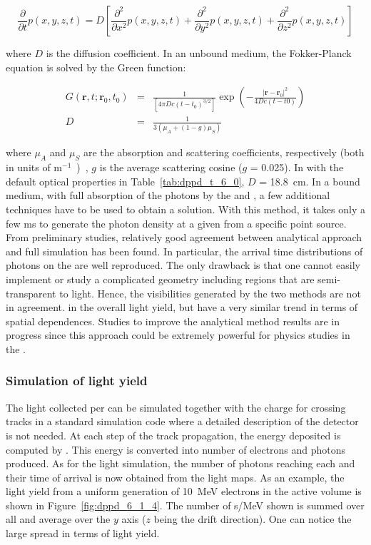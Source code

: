 $$\frac{\partial}{\partial t}p(x,y,z,t) = D\left[\frac{\partial^2}{\partial x^2}p(x,y,z,t) + \frac{\partial^2}{\partial y^2}p(x,y,z,t) + \frac{\partial^2}{\partial z^2}p(x,y,z,t)\right]$$ 

where $D$ is the diffusion coefficient. In an unbound medium, the Fokker-Planck equation is solved by the Green function:

\begin{eqnarray*}
G(\textbf{r}, t; \textbf{r}_0, t_0) &=& \frac{1}{[4\pi D c (t-t_0)^{3/2}]}\exp\left(-\frac{|\textbf{r}-\textbf{r}_0|^2}{4Dc(t-t0)}\right) \\
D &=& \frac{1}{3(\mu_A + (1-g)\mu_S)}
\end{eqnarray*}

where $\mu_A$ and $\mu_S$ are the absorption and scattering coefficients, respectively (both in units of \si{m$^{-1}$}), $g$ is the average scattering cosine ($g$ = \num{0.025}). In \lar with the default optical properties in Table~\ref{tab:dppd_t_6_0}, $D$ = \SI{18.8}{\cm}. In a bound medium, with full absorption of the photons by the  and , a few additional techniques have to be used to obtain a solution. With this method, it takes only a few \si{ms} to generate the photon density at a given  from a specific point source. From preliminary studies, relatively good agreement between analytical approach and full simulation has been found. In particular, the arrival time distributions of photons on the  are well reproduced. The only drawback is that one cannot easily implement or study a complicated geometry including regions that are semi-transparent to light. Hence, the visibilities generated by the two methods are not in agreement. 
in the overall light yield, but have a very similar trend in terms of spatial dependences. Studies to improve the analytical method results are in progress since this approach could be extremely powerful for physics studies in the .

\subsubsection{Simulation of light yield}
\label{subsec:fddp-pd-6.1.4}
The light collected per  can be simulated together with the charge for crossing tracks in a standard simulation code where a detailed description of the detector is not needed. At each step of the track propagation, the energy deposited is computed by . This energy is converted into number of electrons and photons produced. As for the light simulation, the number of photons reaching each  and their time of arrival is now obtained from the light maps. As an example, the light yield from a uniform generation of \SI{10}{MeV} electrons in the active volume is shown in Figure~\ref{fig:dppd_6_1_4}. The number of \phel{}s/\si{MeV} shown is summed over all  and average over the $y$ axis ($z$ being the drift direction). One can notice the large spread in terms of light yield.

